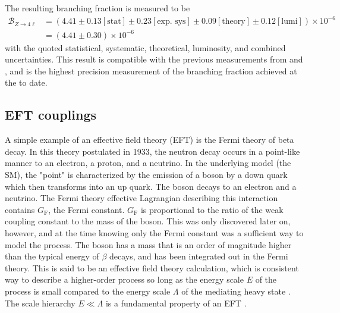 The resulting \ZFourL branching fraction is measured to be
\begin{align*}
    \mathcal{B}_{Z\rightarrow 4\ell} & = \left( 4.41 \pm 0.13 \left[\text{stat}\right] \pm 0.23 \left[\text{exp. sys}\right] \pm 0.09 \left[\text{theory}\right]\pm 0.12 \left[\text{lumi}\right] \right) \times 10^{-6} \\
    & =  \left( 4.41 \pm 0.30 \right) \times 10^{-6}
\end{align*}
with the quoted statistical, systematic, theoretical, luminosity, and combined uncertainties. This result is compatible with the previous measurements from \CMS and \ATLAS, and is the highest precision measurement of the \ZFourL branching fraction achieved at the \LHC to date. 

\subsection{EFT couplings}

A simple example of an effective field theory (EFT) is the Fermi theory of beta decay. In this theory postulated in 1933, the neutron decay occurs in a point-like manner to an electron, a proton, and a neutrino. In the underlying model (the SM), the "point" is characterized by the emission of a \W boson by a down quark which then transforms into an up quark. The \W boson decays to an electron and a neutrino. The Fermi theory effective Lagrangian describing this interaction contains $G_{\text{F}}$, the Fermi constant. $G_{\text{F}}$ is proportional to the ratio of the weak coupling constant to the mass of the \W boson. This was only discovered later on, however, and at the time knowing only the Fermi constant was a sufficient way to model the process. The \W boson has a mass that is an order of magnitude higher than the typical energy of $\beta$ decays, and has been integrated out in the Fermi theory. This is said to be an effective field theory calculation, which is consistent way to describe a higher-order process so long as the energy scale $E$ of the process is small compared to the energy scale $\Lambda$ of the mediating heavy state \cite{De_Simone_2016}. The scale hierarchy $E \ll \Lambda$ is a fundamental property of an EFT \cite{Brehmer2016}.

